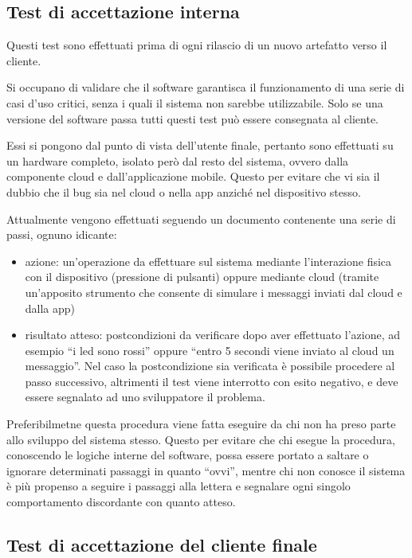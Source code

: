 \documentclass[12pt,a4paper,twoside,titlepage]{book}
\begin{document}
\subsection{Test di accettazione interna}

Questi test sono effettuati prima di ogni rilascio di un nuovo artefatto verso il cliente.

Si occupano di validare che il software garantisca il funzionamento di una serie di casi d'uso critici,
senza i quali il sistema non sarebbe utilizzabile.
Solo se una versione del software passa tutti questi test può essere consegnata al cliente.

Essi si pongono dal punto di vista dell'utente finale, pertanto sono effettuati su un
hardware completo, isolato però dal resto del sistema, ovvero dalla componente cloud
e dall'applicazione mobile. Questo per evitare che vi sia il dubbio che il bug sia
nel cloud o nella app anziché nel dispositivo stesso.

Attualmente vengono effettuati seguendo un documento contenente una serie di passi, ognuno
idicante:

\begin{itemize}
    \item azione: un'operazione da effettuare sul sistema mediante l'interazione fisica
        con il dispositivo (pressione di pulsanti) oppure mediante cloud (tramite un'apposito
        strumento che consente di simulare i messaggi inviati dal cloud e dalla app)
    \item risultato atteso: postcondizioni da verificare dopo aver effettuato l'azione, ad
        esempio ``i led sono rossi'' oppure ``entro 5 secondi viene inviato al cloud un messaggio''.
        Nel caso la postcondizione sia verificata è possibile procedere al passo successivo, altrimenti
        il test viene interrotto con esito negativo, e deve essere segnalato ad uno sviluppatore il problema.
\end{itemize}

Preferibilmetne questa procedura viene fatta eseguire da chi non ha preso parte allo
sviluppo del sistema stesso. Questo per evitare che chi esegue la procedura, conoscendo
le logiche interne del software, possa essere portato a saltare o ignorare determinati
passaggi in quanto ``ovvi'', mentre chi non conosce il sistema è più propenso a seguire
i passaggi alla lettera e segnalare ogni singolo comportamento discordante con quanto
atteso.

\subsection{Test di accettazione del cliente finale}
\end{document}
